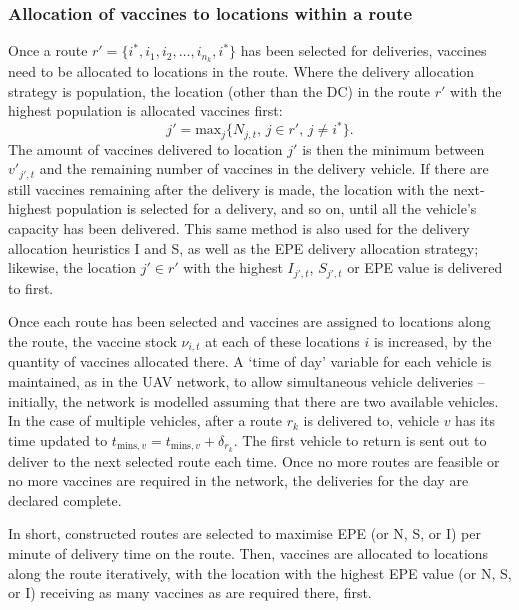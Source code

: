 \subsubsection{Allocation of vaccines to locations within a route}
Once a route $r' =  \{i^{*},i_{1},i_{2},\dots,i_{n_{k}},i^{*}\}$ has been selected for deliveries, vaccines need to be allocated to locations in the route.
Where the delivery allocation strategy is population, the location (other than the DC) in the route $r'$ with the highest population is allocated vaccines first: 
$$j' = \text{max}_{j} \{N_{j,t}, \, j \in r', \, j \neq i^{*} \}.$$ 
The amount of vaccines delivered to location $j'$ is then the minimum between $v'_{j',t}$ and the remaining number of vaccines in the delivery vehicle. If there are still vaccines remaining after the delivery is made, the location with the next-highest population is selected for a delivery, and so on, until all the vehicle's capacity has been delivered. This same method is also used for the delivery allocation heuristics I and S, as well as the EPE delivery allocation strategy; likewise, the location $j' \in r'$ with the highest $I_{j',t}$, $S_{j',t}$ or EPE value is delivered to first. 

Once each route has been selected and vaccines are assigned to locations along the route, the vaccine stock $\nu_{i,t}$ at each of these locations $i$ is increased, by the quantity of vaccines allocated there.  A `time of day' variable for each vehicle is maintained, as in the UAV network, to allow simultaneous vehicle deliveries -- initially, the network is modelled assuming that there are two available vehicles. In the case of multiple vehicles, after a route $r_{k}$ is delivered to, vehicle $v$ has its time updated to $t_{\text{mins},v} = t_{\text{mins},v} + \delta_{r_{k}}.$ The first vehicle to return is sent out to deliver to the next selected route each time. Once no more routes are feasible or no more vaccines are required in the network, the deliveries for the day are declared complete. 

In short, constructed routes are selected to maximise EPE (or N, S, or I) per minute of delivery time on the route. Then, vaccines are allocated to locations along the route iteratively, with the location with the highest EPE value (or N, S, or I) receiving as many vaccines as are required there, first.

